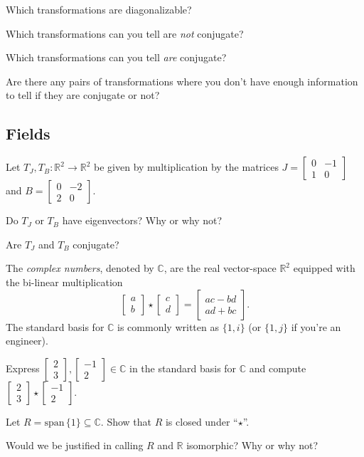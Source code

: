 \documentclass[14pt]{problemset}
\newcommand{\R}{\mathbb{R}}
\newcommand{\C}{\mathbb{C}}
\newcommand{\Span}{\mathrm{span}\,}
\newcommand{\mat}[1]{\begin{bmatrix}#1\end{bmatrix}}
\renewcommand{\d}{\mathrm{d}}
\begin{document}
	\begin{parts}
		\item Which transformations are diagonalizable?
		\item Which transformations can you tell are \emph{not} conjugate?
		\item Which transformations can you tell \emph{are} conjugate?
		\item Are there any pairs of transformations where you don't have enough
			information to tell if they are conjugate or not?
	\end{parts}

	\subsection*{Fields}

	\question
	Let $T_J,T_B:\R^2\to\R^2$ be given by multiplication by the matrices
	$J=\mat{0&-1\\1&0}$ and $B=\mat{0&-2\\2&0}$.
	\begin{parts}
		\item Do $T_J$ or $T_B$ have eigenvectors? Why or why not?
		\item Are $T_J$ and $T_B$ conjugate?
	\end{parts}

	\begin{definition}
		The \emph{complex numbers}, denoted by $\C$, are the real vector-space
		$\R^2$ equipped with the bi-linear multiplication
		\[
			\mat{a\\b}\star\mat{c\\d} = \mat{ac-bd\\ad+bc}.
		\]
		The standard basis for $\C$ is commonly written as $\{1,i\}$
		(or $\{1,j\}$ if you're an engineer).
	\end{definition}

	\question
	\begin{parts}
		\item Express $\mat{2\\3},\mat{-1\\2}\in\C$ in the standard basis for
			$\C$ and compute $\mat{2\\3}\star\mat{-1\\2}$.
		\item Let $R=\Span\{1\}\subseteq \C$. Show that $R$ is closed under
			``$\star$''.
		\item Would we be justified in calling $R$ and $\R$ isomorphic? Why or why not?
	\end{parts}
\end{document}
